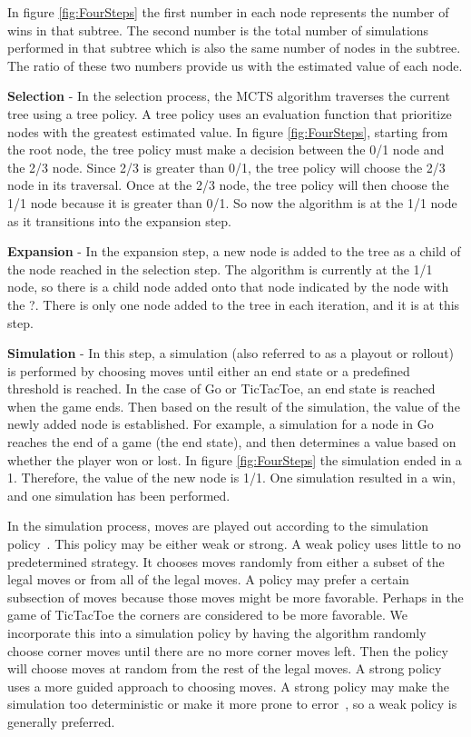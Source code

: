 \documentclass{sig-alternate}
\begin{document}
In figure \ref{fig:FourSteps} the first number in each node represents the number of wins in that subtree. The second number is the total number of simulations performed in that subtree which is also the same number of nodes in the subtree. The ratio of these two numbers provide us with the estimated value of each node.

\textbf{Selection} - In the selection process, the MCTS algorithm traverses the current tree using a tree policy. A tree policy uses an evaluation function that prioritize nodes with the greatest estimated value. In figure \ref{fig:FourSteps}, starting from the root node, the tree policy must make a decision between the 0/1 node and the 2/3 node. Since 2/3 is greater than 0/1, the tree policy will choose the 2/3 node in its traversal. Once at the 2/3 node, the tree policy will then choose the 1/1 node because it is greater than 0/1. So now the algorithm is at the 1/1 node as it transitions into the expansion step.

\textbf{Expansion} - In the expansion step, a new node is added to the tree as a child of the node reached in the selection step. The algorithm is currently at the 1/1 node, so there is a child node added onto that node indicated by the node with the ?. There is only one node added to the tree in each iteration, and it is at this step.

\textbf{Simulation} - In this step, a simulation (also referred to as a playout or rollout) is performed by choosing moves until either an end state or a predefined threshold is reached. In the case of Go or TicTacToe, an end state is reached when the game ends. Then based on the result of the simulation, the value of the newly added node is established. For example, a simulation for a node in Go reaches the end of a game (the end state), and then determines a value based on whether the player won or lost. In figure \ref{fig:FourSteps} the simulation ended in a 1. Therefore, the value of the new node is 1/1. One simulation resulted in a win, and one simulation has been performed.

In the simulation process, moves are played out according to the simulation policy~\cite{ActionSelection}. This policy may be either weak or strong. A weak policy uses little to no predetermined strategy. It chooses moves randomly from either a subset of the legal moves or from all of the legal moves. A policy may prefer a certain subsection of moves because those moves might be more favorable. Perhaps in the game of TicTacToe the corners are considered to be more favorable. We incorporate this into a simulation policy by having the algorithm randomly choose corner moves until there are no more corner moves left. Then the policy will choose moves at random from the rest of the legal moves. A strong policy uses a more guided approach to choosing moves. A strong policy may make the simulation too deterministic or make it more prone to error~\cite{TheGrandChallenge}, so a weak policy is generally preferred. 
\end{document}
